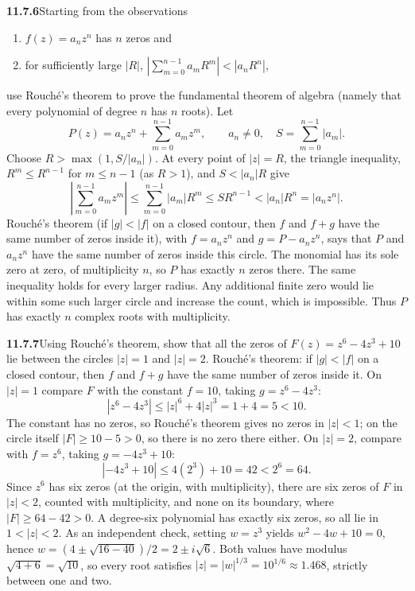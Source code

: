 \par\bigskip
\noindent\textbf{11.7.6}\quad Starting from the observations
\begin{enumerate}
\item[1.] $f(z)=a_n z^n$ has $n$ zeros  and
\item[2.] for sufficiently large $|R|$,
  $\left|\sum_{m=0}^{n-1}a_{m}R^{m}\right| < |a_{n}R^{n}|$,
\end{enumerate}
use Rouch\'e's theorem to prove the fundamental theorem of algebra (namely
that every polynomial of degree $n$ has $n$ roots).
\solution
{}
Let
\[
P(z)=a_nz^n+\sum_{m=0}^{n-1}a_mz^m,\qquad a_n\ne0,
\quad S=\sum_{m=0}^{n-1}|a_m|.
\]
Choose $R>\max(1,S/|a_n|)$. At every point of $|z|=R$, the triangle
inequality, $R^m\le R^{n-1}$ for $m\le n-1$ (as $R>1$), and
$S<|a_n|R$ give
\[
\left|\sum_{m=0}^{n-1}a_mz^m\right|
\le\sum_{m=0}^{n-1}|a_m|R^m
\le SR^{n-1}<|a_n|R^n=|a_nz^n|.
\]
Rouch\'e's theorem (if $|g|<|f|$ on a closed contour, then $f$ and
$f+g$ have the same number of zeros inside it), with $f=a_nz^n$ and
$g=P-a_nz^n$, says that $P$ and $a_nz^n$ have the same number
of zeros inside this circle. The monomial has its sole zero at zero,
of multiplicity $n$, so $P$ has exactly $n$ zeros there. The same
inequality holds for every larger radius. Any additional finite zero
would lie within some such larger circle and increase the count,
which is impossible. Thus $P$ has exactly $n$ complex roots with
multiplicity.

\par\bigskip
\noindent\textbf{11.7.7}\quad Using Rouch\'e's theorem, show that all the
zeros of $F(z)=z^{6}-4z^{3}+10$ lie between the circles $|z|=1$ and $|z|=2$.
\solution
Rouch\'e's theorem: if $|g|<|f|$ on a closed contour, then $f$ and
$f+g$ have the same number of zeros inside it.
On $|z|=1$ compare $F$ with the constant $f=10$, taking
$g=z^6-4z^3$:
\[
|z^6-4z^3|\le|z|^6+4|z|^3=1+4=5<10.
\]
The constant has no zeros, so Rouch\'e's theorem gives no zeros in
$|z|<1$; on the circle itself $|F|\ge10-5>0$, so there is no zero
there either. On $|z|=2$, compare with $f=z^6$, taking $g=-4z^3+10$:
\[
|-4z^3+10|\le4(2^3)+10=42<2^6=64.
\]
Since $z^6$ has six zeros (at the origin, with multiplicity), there
are six zeros of $F$ in $|z|<2$, counted with multiplicity, and none
on its boundary, where $|F|\ge64-42>0$. A degree-six polynomial has
exactly six zeros, so all lie in $1<|z|<2$.
As an independent check, setting $w=z^3$ yields
$w^2-4w+10=0$, hence $w=(4\pm\sqrt{16-40})/2=2\pm i\sqrt6$. Both values
have modulus $\sqrt{4+6}=\sqrt{10}$, so every root satisfies
$|z|=|w|^{1/3}=10^{1/6}\approx1.468$, strictly between one and two.

